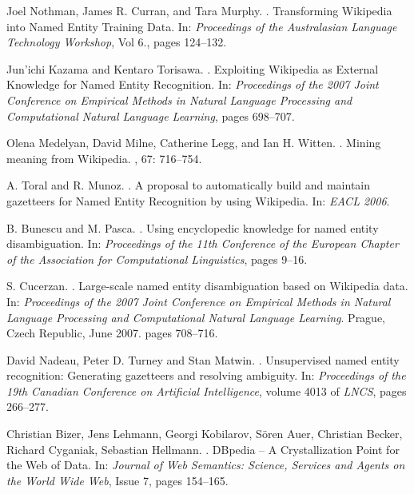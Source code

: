 \documentclass[11pt]{article}
\begin{document}
\begin{thebibliography}{}
Joel Nothman, James R. Curran, and Tara Murphy.
.
\newblock Transforming Wikipedia into Named Entity Training Data.
\newblock In: {\em Proceedings of the Australasian Language Technology Workshop}, Vol 6., pages 124--132.

Jun'ichi Kazama and Kentaro Torisawa.
.
\newblock Exploiting Wikipedia as External Knowledge for Named Entity Recognition.
\newblock In: {\em Proceedings of the 2007 Joint Conference on Empirical Methods in Natural Language Processing and Computational Natural Language Learning}, pages 698--707.

Olena Medelyan, David Milne, Catherine Legg, and Ian H. Witten.
.
\newblock Mining meaning from Wikipedia.
, 67: 716--754.

A. Toral and R. Munoz.
.
\newblock A proposal to automatically build and maintain gazetteers for Named Entity Recognition by using Wikipedia.
\newblock In: {\em EACL 2006}.

B. Bunescu and M. Pasca.
.
\newblock Using encyclopedic knowledge for named entity disambiguation.
\newblock In: {\em Proceedings of the 11th Conference of the European Chapter of the Association for Computational Linguistics}, pages 9--16.

S. Cucerzan.
.
\newblock Large-scale named entity disambiguation based on Wikipedia data.
\newblock In: {\em Proceedings of the 2007 Joint Conference on Empirical Methods in Natural Language Processing and Computational Natural Language Learning}.
\newblock Prague, Czech Republic, June 2007. pages 708--716.

David Nadeau, Peter D. Turney and Stan Matwin.
.
\newblock Unsupervised named entity recognition: Generating gazetteers and resolving ambiguity. 
\newblock In: {\em Proceedings of the 19th Canadian Conference on Artificial Intelligence}, volume 4013 of {\em LNCS}, pages 266--277.

Christian Bizer, Jens Lehmann, Georgi Kobilarov, Sören Auer, Christian Becker, Richard Cyganiak, Sebastian Hellmann.
.
\newblock DBpedia -- A Crystallization Point for the Web of Data. 
\newblock In: {\em Journal of Web Semantics: Science, Services and Agents on the World Wide Web}, Issue 7, pages 154--165.



\end{thebibliography}
\end{document}
